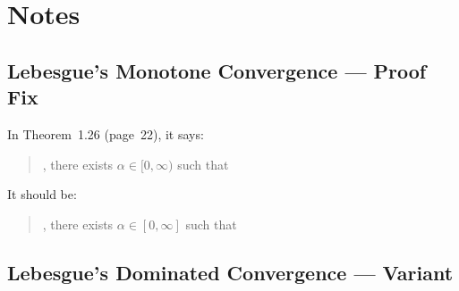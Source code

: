 

\section{Notes}

\subsection{Lebesgue's Monotone Convergence --- Proof Fix}

In Theorem~1.26 (page~22), it says:
\begin{quotation}
 \mldots, there exists \(\alpha \in [0,\infty)\) such that
\end{quotation}
It should be:
\begin{quotation}
 \mldots, there exists \(\alpha \in [0,\infty]\) such that
\end{quotation}

\subsection{Lebesgue's Dominated Convergence --- Variant}

